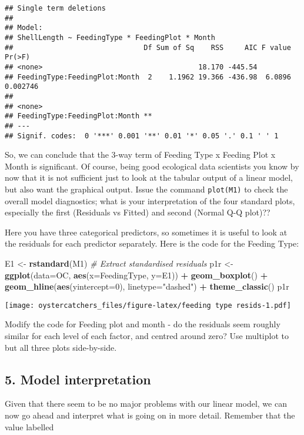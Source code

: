 \documentclass[]{article}
\newenvironment{Shaded}{\begin{snugshade}}{\end{snugshade}}
\newcommand{\KeywordTok}[1]{\textcolor[rgb]{0.13,0.29,0.53}{\textbf{#1}}}
\newcommand{\DataTypeTok}[1]{\textcolor[rgb]{0.13,0.29,0.53}{#1}}
\newcommand{\DecValTok}[1]{\textcolor[rgb]{0.00,0.00,0.81}{#1}}
\newcommand{\StringTok}[1]{\textcolor[rgb]{0.31,0.60,0.02}{#1}}
\newcommand{\CommentTok}[1]{\textcolor[rgb]{0.56,0.35,0.01}{\textit{#1}}}
\newcommand{\OperatorTok}[1]{\textcolor[rgb]{0.81,0.36,0.00}{\textbf{#1}}}
\newcommand{\NormalTok}[1]{#1}
\begin{document}
\begin{verbatim}
## Single term deletions
## 
## Model:
## ShellLength ~ FeedingType * FeedingPlot * Month
##                               Df Sum of Sq    RSS     AIC F value   Pr(>F)
## <none>                                     18.170 -445.54                 
## FeedingType:FeedingPlot:Month  2    1.1962 19.366 -436.98  6.0896 0.002746
##                                 
## <none>                          
## FeedingType:FeedingPlot:Month **
## ---
## Signif. codes:  0 '***' 0.001 '**' 0.01 '*' 0.05 '.' 0.1 ' ' 1
\end{verbatim}

So, we can conclude that the 3-way term of Feeding Type x Feeding Plot x
Month is significant. Of course, being good ecological data scientists
you know by now that it is not sufficient just to look at the tabular
output of a linear model, but also want the graphical output. Issue the
command \texttt{plot(M1)} to check the overall model diagnostics; what
is your interpretation of the four standard plots, especially the first
(Residuals vs Fitted) and second (Normal Q-Q plot)??

Here you have three categorical predictors, so sometimes it is useful to
look at the residuals for each predictor separately. Here is the code
for the Feeding Type:

\begin{Shaded}
\begin{Highlighting}[]
\NormalTok{E1 <-}\StringTok{ }\KeywordTok{rstandard}\NormalTok{(M1) }\CommentTok{# Extract standardised residuals}
\NormalTok{p1r <-}\StringTok{ }\KeywordTok{ggplot}\NormalTok{(}\DataTypeTok{data=}\NormalTok{OC, }\KeywordTok{aes}\NormalTok{(}\DataTypeTok{x=}\NormalTok{FeedingType, }\DataTypeTok{y=}\NormalTok{E1)) }\OperatorTok{+}
\StringTok{  }\KeywordTok{geom_boxplot}\NormalTok{() }\OperatorTok{+}
\StringTok{  }\KeywordTok{geom_hline}\NormalTok{(}\KeywordTok{aes}\NormalTok{(}\DataTypeTok{yintercept=}\DecValTok{0}\NormalTok{), }\DataTypeTok{linetype=}\StringTok{"dashed"}\NormalTok{) }\OperatorTok{+}
\StringTok{  }\KeywordTok{theme_classic}\NormalTok{()}
\NormalTok{p1r}
\end{Highlighting}
\end{Shaded}

\texttt{[image: oystercatchers\_files/figure-latex/feeding type resids-1.pdf]}

Modify the code for Feeding plot and month - do the residuals seem
roughly similar for each level of each factor, and centred around zero?
Use multiplot to but all three plots side-by-side.

\subsection{5. Model interpretation}\label{model-interpretation}

Given that there seem to be no major problems with our linear model, we
can now go ahead and interpret what is going on in more detail. Remember
that the value labelled
\end{document}
